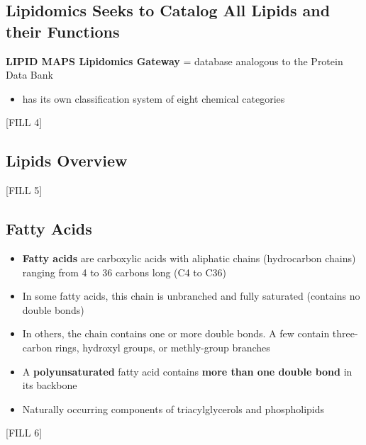 \documentclass[10pt]{article}
\begin{document}
\subsection*{Lipidomics Seeks to Catalog All Lipids and their Functions}
\textbf{LIPID MAPS Lipidomics Gateway} = database analogous to the Protein Data Bank
\begin{itemize}
    \item has its own classification system of eight chemical categories
\end{itemize}
\begin{center}
    [FILL 4]
\end{center}

\subsection*{Lipids Overview}
\begin{center}
    [FILL 5]
\end{center}

\subsection*{Fatty Acids}
\begin{itemize}
    \item \textbf{Fatty acids} are carboxylic acids with aliphatic chains (hydrocarbon chains) ranging from 4 to 36 carbons long (C4 to C36)
    \item In some fatty acids, this chain is unbranched and fully saturated (contains no double bonds)
    \item In others, the chain contains one or more double bonds.  A few contain three-carbon rings, hydroxyl groups, or methly-group branches
    \item A \textbf{polyunsaturated} fatty acid contains \textbf{more than one double bond} in its backbone
    \item Naturally occurring components of triacylglycerols and phospholipids
\end{itemize}
\begin{center}
    [FILL 6]
\end{center}
\end{document}
